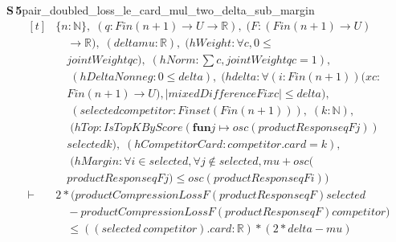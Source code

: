 \documentclass[conference]{IEEEtran}
\theoremstyle{definition}
\newcommand{\lean}[1]{\textsf{\footnotesize #1}}
\begin{document}
\noindent\textbf{S\,5}\quad\lean{pair\_doubled\_loss\_le\_card\_mul\_two\_delta\_sub\_margin}
{\footnotesize\[ \begin{aligned}[t]
&\{ \mathit{n} : \mathbb{N} \},\; (\mathit{q} : \mathit{Fin} (\mathit{n} + 1) \to \mathit{U} \to \mathbb{R} ),\; (\mathit{F} : (\mathit{Fin} (\mathit{n} + 1) \to \mathit{U})\\
&\quad \to \mathbb{R} ),\; (\mathit{delta} \mathit{mu} : \mathbb{R} ),\; (\mathit{hWeight} : \forall \mathit{c}, 0 \leq\\
&\quad \mathit{jointWeight} \mathit{q} \mathit{c}),\; (\mathit{hNorm} : \textstyle\sum \mathit{c}, \mathit{jointWeight} \mathit{q} \mathit{c} = 1),\\
&\quad \; (\mathit{hDeltaNonneg} : 0 \leq \mathit{delta}),\; (\mathit{hdelta} : \forall (\mathit{i} : \mathit{Fin} (\mathit{n} + 1)) (\mathit{x} \mathit{c} :\\
&\quad \mathit{Fin} (\mathit{n} + 1) \to \mathit{U}), |\mathit{mixedDifference} \mathit{F} \mathit{i} \mathit{x} \mathit{c}| \leq \mathit{delta}),\\
&\quad \; (\mathit{selected} \mathit{competitor} : \mathit{Finset} (\mathit{Fin} (\mathit{n} + 1))),\; (\mathit{k} : \mathbb{N} ),\\
&\quad \; (\mathit{hTop} : \mathit{IsTopKByScore} (\mathbf{fun} \mathit{j} \mapsto \mathit{osc} (\mathit{productResponse} \mathit{q} \mathit{F} \mathit{j}))\\
&\quad \mathit{selected} \mathit{k}),\; (\mathit{hCompetitorCard} : \mathit{competitor}.\mathit{card} = \mathit{k}),\\
&\quad \; (\mathit{hMargin} : \forall \mathit{i} \in \mathit{selected}, \forall \mathit{j} \notin \mathit{selected}, \mathit{mu} + \mathit{osc} (\\
&\quad \mathit{productResponse} \mathit{q} \mathit{F} \mathit{j}) \leq \mathit{osc} (\mathit{productResponse} \mathit{q} \mathit{F} \mathit{i}))\\
\vdash\;&2 * (\mathit{productCompressionLoss} \mathit{F} (\mathit{productResponse} \mathit{q} \mathit{F}) \mathit{selected}\\
&\quad - \mathit{productCompressionLoss} \mathit{F} (\mathit{productResponse} \mathit{q} \mathit{F}) \mathit{competitor})\\
&\quad \leq ((\mathit{selected} \ \mathit{competitor}).\mathit{card} : \mathbb{R} ) * (2 * \mathit{delta} - \mathit{mu})
\end{aligned} \]}
\end{document}
